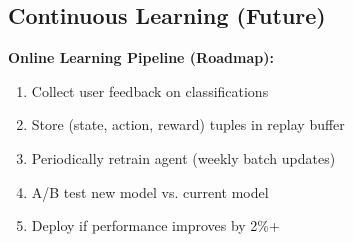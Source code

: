 \subsection{Continuous Learning (Future)}

\textbf{Online Learning Pipeline (Roadmap):}
\begin{enumerate}
    \item Collect user feedback on classifications
    \item Store (state, action, reward) tuples in replay buffer
    \item Periodically retrain agent (weekly batch updates)
    \item A/B test new model vs. current model
    \item Deploy if performance improves by 2\%+
\end{enumerate}



